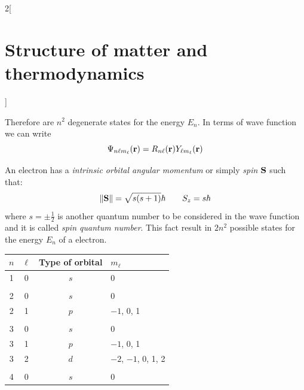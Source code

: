 \documentclass[../../../main.tex]{subfiles}
\begin{document}
\begin{multicols}{2}[\section{Structure of matter and thermodynamics}]
\begin{definition}
\begin{itemize}
        \end{itemize}
        Therefore are $n^2$ degenerate states for the energy $E_n$.
        In terms of wave function we can write $$\Psi_{n\ell m_\ell}(\boldsymbol{\mathrm{r}})=R_{n\ell}(\boldsymbol{\mathrm{r}})Y_{\ell m_\ell}(\boldsymbol{\mathrm{r}})$$
    \end{definition}
    \begin{definition}[Spin]
        An electron has a \textit{intrinsic orbital angular momentum} or simply \textit{spin $\boldsymbol{\mathrm{S}}$} such that:
        $$\|\boldsymbol{\mathrm{S}}\|=\sqrt{s(s+1)}\hbar\qquad S_z=s\hbar$$ where $s=\pm\frac{1}{2}$ is another quantum number  to be considered in the wave function and it is called \textit{spin quantum number}. This fact result in $2n^2$ possible states for the energy $E_n$ of a electron.
    \end{definition}
    \begin{center}
        \begin{minipage}{\linewidth}
            \centering
            \begin{tabular}{cccl}
                \hline
                \hline
                $n$ & $\ell$ & Type of orbital & $m_\ell$                              \\
                \hline
                1   & 0      & $s$             & 0                                     \\
                    &        &                 &                                       \\
                2   & 0      & $s$             & 0                                     \\
                2   & 1      & $p$             & $-1$, 0, 1                            \\
                    &        &                 &                                       \\
                3   & 0      & $s$             & 0                                     \\
                3   & 1      & $p$             & $-1$, 0, 1                            \\
                3   & 2      & $d$             & $-2$, $-1$, 0, 1, 2                   \\
                    &        &                 &                                       \\
                4   & 0      & $s$             & 0                                     \\

\end{tabular}
\end{minipage}
\end{center}
\end{multicols}
\end{document}
